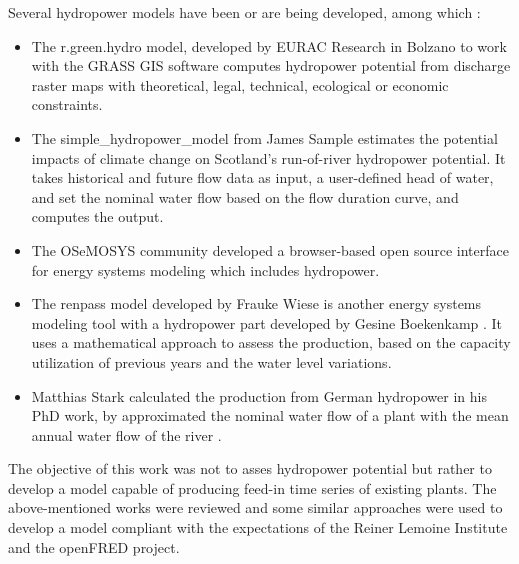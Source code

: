 Several hydropower models have been or are being developed, among which : 
\begin{itemize}
 \item The r.green.hydro model, developed by EURAC Research in Bolzano \cite{grass} to work with the GRASS GIS software computes hydropower potential from discharge raster maps with theoretical, legal, technical, ecological or economic constraints.
 \item The simple{\_}hydropower{\_}model from James Sample \cite{sample} estimates the potential impacts of climate change on Scotland's run-of-river hydropower potential. It takes historical and future flow data as input, a user-defined head of water, and set the nominal water flow based on the flow duration curve, and computes the output.
 \item The OSeMOSYS community \cite{osemosys} developed a browser-based open source interface for energy systems modeling which includes hydropower.
 \item The renpass model \cite{wiese} developed by Frauke Wiese is another energy systems modeling tool with a hydropower part developed by Gesine Boekenkamp \cite{gesine}. It uses a mathematical approach to assess the production, based on the capacity utilization of previous years and the water level variations.
 \item Matthias Stark calculated the production from German hydropower in his PhD work, by approximated the nominal water flow of a plant with the mean annual water flow of the river \cite{stark}.
\end{itemize}
The objective of this work was not to asses hydropower potential but rather to develop a model capable of producing feed-in time series of existing plants. The above-mentioned works were reviewed and some similar approaches were used to develop a model compliant with the expectations of the Reiner Lemoine Institute and the openFRED project.